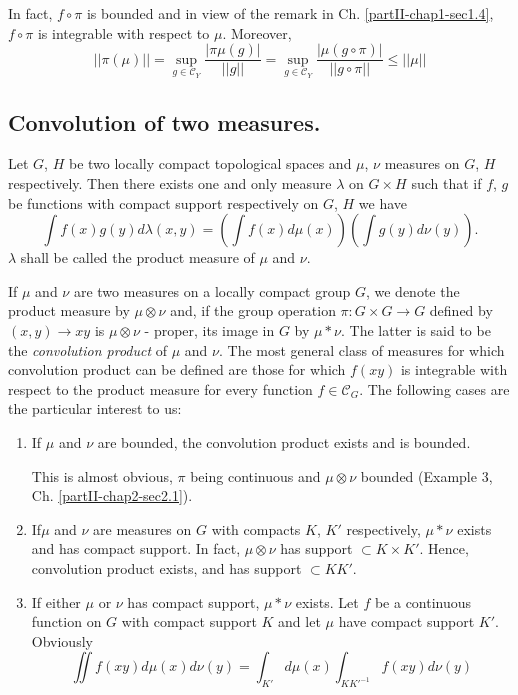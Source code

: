 In fact, $f \circ \pi$ is bounded and in view of the remark in
Ch. \ref{partII-chap1-sec1.4}, $f\circ \pi$ is integrable with respect
to $\mu$. Moreover,   
$$
|| \pi (\mu) || = \sup\limits_{g \in \mathscr{C}_Y}  \frac{| \pi \mu (g)
  |}{|| g ||} = \sup\limits_{g \in \mathscr{C}_Y}  \frac{|\mu(g \circ
  \pi)|}{|| g \circ \pi ||} \leq || \mu || 
$$



\subsection{Convolution of two
  measures.}\label{partII-chap2-sec2.2}%

Let $G$, $H$ be two locally compact topological spaces and $\mu$,
$\nu$ measures on $G$, $H$ respectively. Then there exists one and
only measure  $\lambda$ on $G \times H$ such that if $f$, $g$ be
functions with compact support respectively on $G$, $H$ we have 
$$
\int f(x)  g(y) d \lambda (x,y) = (\int f(x)d\mu (x)) (\int g (y) d
\nu (y)). 
$$
$\lambda$ shall be called the product measure of $\mu$ and $\nu$. 

If $\mu$ and $\nu$ are two  measures on a locally compact group $G$,
we denote the product measure by $\mu \otimes \nu$ and, if the group
operation $\pi : G \times G \rightarrow G$  
defined by $(x,y) \rightarrow xy$ is $\mu \otimes \nu$ - proper, its
image in $G$ by $\mu*\nu$. The latter is said to be the
\textit{convolution product} of $\mu$ and $\nu$. The most general
class of measures for which convolution product can be defined are
those for which $f(xy)$ is integrable with respect to the product
measure for every function $f \in \mathscr{C}_G$. The following cases
are the particular interest to us: 
\begin{enumerate}
\renewcommand{\labelenumi}{(\theenumi)}
\item If $\mu$ and $\nu$ are bounded, the convolution product exists
  and is bounded. 

 This is almost obvious, $\pi$ being continuous and $\mu\otimes\nu$
 bounded (Example 3, Ch. \ref{partII-chap2-sec2.1}).   

\item If\pageoriginale $\mu$ and $\nu$ are measures on $G$ with
  compacts $K$, $K'$ 
  respectively, $\mu * \nu$ exists and has compact support. In fact,
  $\mu \otimes \nu$ has support $\subset K \times K'$. Hence,
  convolution product exists, and has support $\subset KK'$. 

\item If either $\mu$ or $\nu$ has compact support, $\mu * \nu$
  exists. Let $f$ be a continuous function on $G$ with compact 
support $K$ and let $\mu$ have compact support $K'$. Obviously 
$$
\iint f(xy) d \mu (x) d \nu (y) = \int_{K'} d \mu (x)
\int_{KK'^{-1}}f(xy)d \nu (y) 
$$
\end{enumerate}

